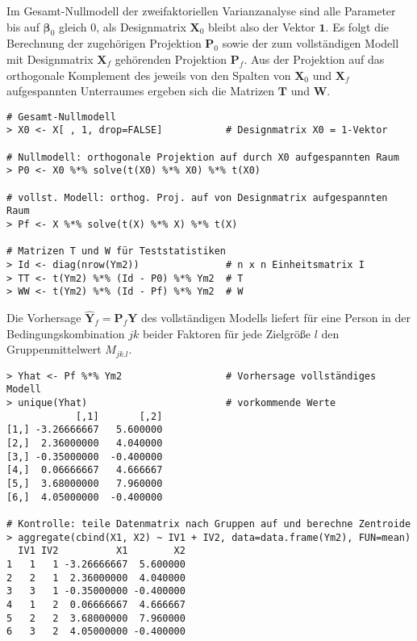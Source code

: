 Im Gesamt-Nullmodell der zweifaktoriellen Varianzanalyse sind alle Parameter bis auf $\bm{\bm{\beta}}_{0}$ gleich $0$, als Designmatrix $\bm{X}_{0}$ bleibt also der Vektor $\bm{1}$. Es folgt die Berechnung der zugehörigen Projektion $\bm{P}_{0}$ sowie der zum vollständigen Modell mit Designmatrix $\bm{X}_{f}$ gehörenden Projektion $\bm{P}_{f}$. Aus der Projektion auf das orthogonale Komplement des jeweils von den Spalten von $\bm{X}_{0}$ und $\bm{X}_{f}$ aufgespannten Unterraumes ergeben sich die Matrizen $\bm{T}$ und $\bm{W}$.
\begin{lstlisting}
# Gesamt-Nullmodell
> X0 <- X[ , 1, drop=FALSE]           # Designmatrix X0 = 1-Vektor

# Nullmodell: orthogonale Projektion auf durch X0 aufgespannten Raum
> P0 <- X0 %*% solve(t(X0) %*% X0) %*% t(X0)

# vollst. Modell: orthog. Proj. auf von Designmatrix aufgespannten Raum
> Pf <- X %*% solve(t(X) %*% X) %*% t(X)

# Matrizen T und W für Teststatistiken
> Id <- diag(nrow(Ym2))               # n x n Einheitsmatrix I
> TT <- t(Ym2) %*% (Id - P0) %*% Ym2  # T
> WW <- t(Ym2) %*% (Id - Pf) %*% Ym2  # W
\end{lstlisting}

Die Vorhersage $\hat{\bm{Y}}_{f} = \bm{P}_{f} \bm{Y}$ des vollständigen Modells liefert für eine Person in der Bedingungskombination $jk$ beider Faktoren für jede Zielgröße $l$ den Gruppenmittelwert $M_{jk.l}$.
\begin{lstlisting}
> Yhat <- Pf %*% Ym2                  # Vorhersage vollständiges Modell
> unique(Yhat)                        # vorkommende Werte
            [,1]       [,2]
[1,] -3.26666667   5.600000
[2,]  2.36000000   4.040000
[3,] -0.35000000  -0.400000
[4,]  0.06666667   4.666667
[5,]  3.68000000   7.960000
[6,]  4.05000000  -0.400000

# Kontrolle: teile Datenmatrix nach Gruppen auf und berechne Zentroide
> aggregate(cbind(X1, X2) ~ IV1 + IV2, data=data.frame(Ym2), FUN=mean)
  IV1 IV2          X1        X2
1   1   1 -3.26666667  5.600000
2   2   1  2.36000000  4.040000
3   3   1 -0.35000000 -0.400000
4   1   2  0.06666667  4.666667
5   2   2  3.68000000  7.960000
6   3   2  4.05000000 -0.400000
\end{lstlisting}

